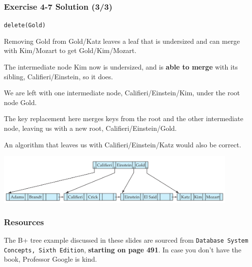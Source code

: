 \begin{frame}
\frametitle{Exercise 4-7 Solution (3/3)}

\texttt{delete(Gold)}

Removing Gold from Gold/Katz leaves a leaf that is undersized and can merge with Kim/Mozart to get Gold/Kim/Mozart.

The intermediate node Kim now is undersized, and is \textbf{able to merge} with its sibling, Califieri/Einstein, so it does.

We are left with one intermediate node, Califieri/Einstein/Kim, under the root node Gold.

The key replacement here merges keys from the root and the other intermediate node, leaving us with a new root, Califieri/Einstein/Gold.

An algorithm that leaves us with Califieri/Einstein/Katz would also be correct.

\begin{center}
  \includegraphics[width=0.9\textwidth]{images/b-tree-delete_gold.png}
\end{center}

\end{frame}


\begin{frame}
\frametitle{Resources}

The B+ tree example discussed in these slides are sourced from \texttt{Database System Concepts, Sixth Edition}, \textbf{starting on page 491}. In case you don't have the book, Professor Google is kind.

\end{frame}


